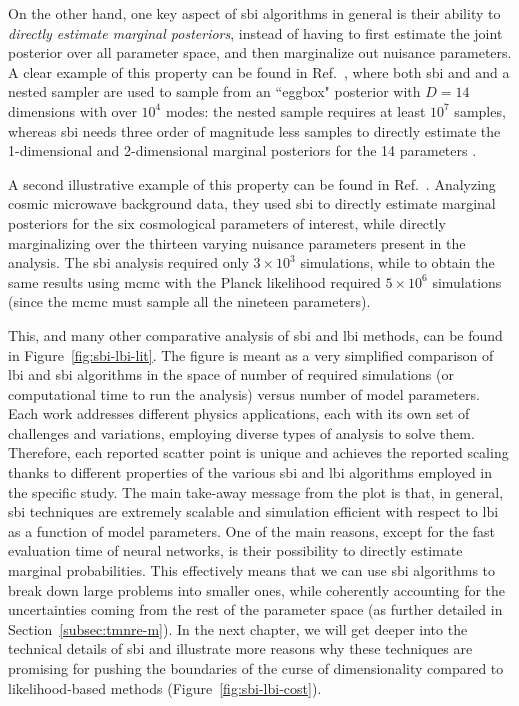 On the other hand, one key aspect of \gls*{sbi} algorithms in general is their ability to \emph{directly estimate marginal posteriors}, instead of having to first estimate the joint posterior over all parameter space, and then marginalize out nuisance parameters. A clear example of this property can be found in Ref.~\cite{Miller:2020hua}, where both \gls*{sbi} and and a nested sampler are used to sample from an ``eggbox" posterior with $D=14$ dimensions with over $10^4$ modes: the nested sample requires at least $10^7$ samples, whereas \gls*{sbi} needs three order of magnitude less samples to directly estimate the 1-dimensional and 2-dimensional marginal posteriors for the 14 parameters \cite[Figure 2 in][]{Miller:2020hua}. 

A second illustrative example of this property can be found in Ref.~\cite{Cole:2021gwr}. Analyzing cosmic microwave background data, they used \gls*{sbi} to directly estimate marginal posteriors for the six cosmological parameters of interest, while directly marginalizing over the thirteen varying nuisance parameters present in the analysis. The \gls*{sbi} analysis required only $3\times10^3$ simulations, while to obtain the same results using \gls*{mcmc} with the Planck likelihood required $5\times10^6$ simulations (since the \gls*{mcmc} must sample all the nineteen parameters). 

This, and many other comparative analysis of \gls*{sbi} and \gls*{lbi} methods, can be found in Figure~\ref{fig:sbi-lbi-lit}. The figure is meant as a very simplified comparison of \gls*{lbi} and \gls*{sbi} algorithms in the space of number of required simulations (or computational time to run the analysis) versus number of model parameters. Each work addresses different physics applications, each with its own set of challenges and variations, employing diverse types of analysis to solve them. Therefore, each reported scatter point is unique and achieves the reported scaling thanks to different properties of the various \gls*{sbi} and \gls*{lbi} algorithms employed in the specific study. The main take-away message from the plot is that, in general, \gls*{sbi} techniques are extremely scalable and simulation efficient with respect to \gls*{lbi} as a function of model parameters. One of the main reasons, except for the fast evaluation time of neural networks, is their possibility to directly estimate marginal probabilities. This effectively means that we can use \gls*{sbi} algorithms to break down large problems into smaller ones, while coherently accounting for the uncertainties coming from the rest of the parameter space (as further detailed in Section~\ref{subsec:tmnre-m}). In the next chapter, we will get deeper into the technical details of \gls*{sbi} and illustrate more reasons why these techniques are promising for pushing the boundaries of the curse of dimensionality compared to likelihood-based methods (Figure~\ref{fig:sbi-lbi-cost}).

